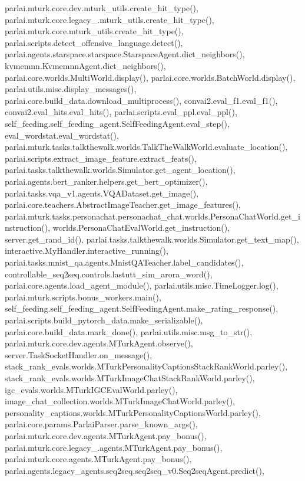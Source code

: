 parlai.\+mturk.\+core.\+dev.\+mturk\+\_\+utils.\+create\+\_\+hit\+\_\+type(), parlai.\+mturk.\+core.\+legacy\+\_.\+mturk\+\_\+utils.\+create\+\_\+hit\+\_\+type(), parlai.\+mturk.\+core.\+mturk\+\_\+utils.\+create\+\_\+hit\+\_\+type(), parlai.\+scripts.\+detect\+\_\+offensive\+\_\+language.\+detect(), parlai.\+agents.\+starspace.\+starspace.\+Starspace\+Agent.\+dict\+\_\+neighbors(), kvmemnn.\+Kvmemnn\+Agent.\+dict\+\_\+neighbors(), parlai.\+core.\+worlds.\+Multi\+World.\+display(), parlai.\+core.\+worlds.\+Batch\+World.\+display(), parlai.\+utils.\+misc.\+display\+\_\+messages(), parlai.\+core.\+build\+\_\+data.\+download\+\_\+multiprocess(), convai2.\+eval\+\_\+f1.\+eval\+\_\+f1(), convai2.\+eval\+\_\+hits.\+eval\+\_\+hits(), parlai.\+scripts.\+eval\+\_\+ppl.\+eval\+\_\+ppl(), self\+\_\+feeding.\+self\+\_\+feeding\+\_\+agent.\+Self\+Feeding\+Agent.\+eval\+\_\+step(), eval\+\_\+wordstat.\+eval\+\_\+wordstat(), parlai.\+mturk.\+tasks.\+talkthewalk.\+worlds.\+Talk\+The\+Walk\+World.\+evaluate\+\_\+location(), parlai.\+scripts.\+extract\+\_\+image\+\_\+feature.\+extract\+\_\+feats(), parlai.\+tasks.\+talkthewalk.\+worlds.\+Simulator.\+get\+\_\+agent\+\_\+location(), parlai.\+agents.\+bert\+\_\+ranker.\+helpers.\+get\+\_\+bert\+\_\+optimizer(), parlai.\+tasks.\+vqa\+\_\+v1.\+agents.\+V\+Q\+A\+Dataset.\+get\+\_\+image(), parlai.\+core.\+teachers.\+Abstract\+Image\+Teacher.\+get\+\_\+image\+\_\+features(), parlai.\+mturk.\+tasks.\+personachat.\+personachat\+\_\+chat.\+worlds.\+Persona\+Chat\+World.\+get\+\_\+instruction(), worlds.\+Persona\+Chat\+Eval\+World.\+get\+\_\+instruction(), server.\+get\+\_\+rand\+\_\+id(), parlai.\+tasks.\+talkthewalk.\+worlds.\+Simulator.\+get\+\_\+text\+\_\+map(), interactive.\+My\+Handler.\+interactive\+\_\+running(), parlai.\+tasks.\+mnist\+\_\+qa.\+agents.\+Mnist\+Q\+A\+Teacher.\+label\+\_\+candidates(), controllable\+\_\+seq2seq.\+controls.\+lastutt\+\_\+sim\+\_\+arora\+\_\+word(), parlai.\+core.\+agents.\+load\+\_\+agent\+\_\+module(), parlai.\+utils.\+misc.\+Time\+Logger.\+log(), parlai.\+mturk.\+scripts.\+bonus\+\_\+workers.\+main(), self\+\_\+feeding.\+self\+\_\+feeding\+\_\+agent.\+Self\+Feeding\+Agent.\+make\+\_\+rating\+\_\+response(), parlai.\+scripts.\+build\+\_\+pytorch\+\_\+data.\+make\+\_\+serializable(), parlai.\+core.\+build\+\_\+data.\+mark\+\_\+done(), parlai.\+utils.\+misc.\+msg\+\_\+to\+\_\+str(), parlai.\+mturk.\+core.\+dev.\+agents.\+M\+Turk\+Agent.\+observe(), server.\+Task\+Socket\+Handler.\+on\+\_\+message(), stack\+\_\+rank\+\_\+evals.\+worlds.\+M\+Turk\+Personality\+Captions\+Stack\+Rank\+World.\+parley(), stack\+\_\+rank\+\_\+evals.\+worlds.\+M\+Turk\+Image\+Chat\+Stack\+Rank\+World.\+parley(), igc\+\_\+evals.\+worlds.\+M\+Turk\+I\+G\+C\+Eval\+World.\+parley(), image\+\_\+chat\+\_\+collection.\+worlds.\+M\+Turk\+Image\+Chat\+World.\+parley(), personality\+\_\+captions.\+worlds.\+M\+Turk\+Personality\+Captions\+World.\+parley(), parlai.\+core.\+params.\+Parlai\+Parser.\+parse\+\_\+known\+\_\+args(), parlai.\+mturk.\+core.\+dev.\+agents.\+M\+Turk\+Agent.\+pay\+\_\+bonus(), parlai.\+mturk.\+core.\+legacy\+\_.\+agents.\+M\+Turk\+Agent.\+pay\+\_\+bonus(), parlai.\+mturk.\+core.\+agents.\+M\+Turk\+Agent.\+pay\+\_\+bonus(), parlai.\+agents.\+legacy\+\_\+agents.\+seq2seq.\+seq2seq\+\_\+v0.\+Seq2seq\+Agent.\+predict(), 